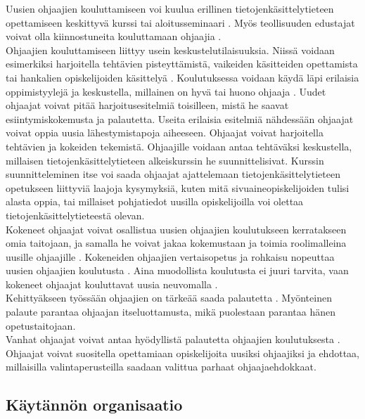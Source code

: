 \documentclass[finnish]{tktltiki2}
\theoremstyle{definition}
\theoremstyle{remark}
\begin{document}
Uusien ohjaajien kouluttamiseen voi kuulua erillinen tietojenkäsittelytieteen opettamiseen keskittyvä kurssi \cite{Reges88, Roberts95} tai aloitusseminaari \cite{Sperry08}.  Myös teollisuuden edustajat voivat olla kiinnostuneita kouluttamaan ohjaajia \cite{Morgan02}.
\\
Ohjaajien kouluttamiseen liittyy usein keskustelutilaisuuksia. Niissä voidaan esimerkiksi harjoitella tehtävien pisteyttämistä, vaikeiden käsitteiden opettamista tai hankalien opiskelijoiden käsittelyä \cite{Reges03}. Koulutuksessa voidaan käydä läpi erilaisia oppimistyylejä ja keskustella, millainen on hyvä tai huono ohjaaja \cite{Kay95}. Uudet ohjaajat voivat pitää harjoitusesitelmiä toisilleen, mistä he saavat esiintymiskokemusta ja palautetta. Useita erilaisia esitelmiä nähdessään ohjaajat voivat oppia uusia lähestymistapoja aiheeseen. Ohjaajat voivat harjoitella tehtävien ja kokeiden tekemistä. Ohjaajille voidaan antaa tehtäväksi keskustella, millaisen tie\-to\-jen\-kä\-sit\-te\-ly\-tie\-teen alkeiskurssin he suunnittelisivat. Kurssin suunnitteleminen itse voi saada ohjaajat ajattelemaan tietojenkäsittelytieteen opetukseen liittyviä laajoja kysymyksiä, kuten mitä sivuaineopiskelijoiden tulisi alasta oppia, tai millaiset pohjatiedot uusilla opiskelijoilla voi olettaa tietojenkäsittelytieteestä olevan. 
\\
Kokeneet ohjaajat voivat osallistua uusien ohjaajien koulutukseen kerratakseen omia taitojaan, ja samalla he voivat jakaa kokemustaan ja toimia roolimalleina uusille ohjaajille \cite{Reges88}. Kokeneiden ohjaajien vertaisopetus ja rohkaisu nopeuttaa uusien ohjaajien koulutusta \cite{Decker06}. Aina muodollista koulutusta ei juuri tarvita, vaan kokeneet ohjaajat kouluttavat uusia neuvomalla \cite{Kurhila11}.
\\
Kehittyäkseen työssään ohjaajien on tärkeää saada palautetta \cite{Patitsas12, Patitsas12_3}. Myönteinen palaute parantaa ohjaajan itseluottamusta, mikä puolestaan parantaa hänen opetustaitojaan.
\\
Vanhat ohjaajat voivat antaa hyödyllistä palautetta ohjaajien koulutuksesta \cite{Decker06}. Ohjaajat voivat suositella opettamiaan opiskelijoita uusiksi ohjaajiksi ja ehdottaa, millaisilla valintaperusteilla saadaan valittua parhaat ohjaajaehdokkaat. 



\subsection{Käytännön organisaatio}
\end{document}
